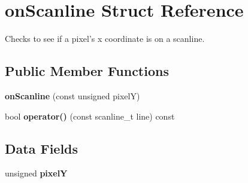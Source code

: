 \hypertarget{structonScanline}{
\section{onScanline Struct Reference}
\label{structonScanline}
}


Checks to see if a pixel's x coordinate is on a scanline.  


\subsection*{Public Member Functions}
\begin{DoxyCompactItemize}
\item 
\hypertarget{structonScanline_abb0bedaa715b27f8e48ae870c1fb80cb}{
{\bfseries onScanline} (const unsigned pixelY)}
\label{structonScanline_abb0bedaa715b27f8e48ae870c1fb80cb}

\item 
\hypertarget{structonScanline_ac482ea4c8b4641ac501bcbc1fdb82f94}{
bool {\bfseries operator()} (const scanline\_\-t line) const }
\label{structonScanline_ac482ea4c8b4641ac501bcbc1fdb82f94}

\end{DoxyCompactItemize}
\subsection*{Data Fields}
\begin{DoxyCompactItemize}
\item 
\hypertarget{structonScanline_acbfa8567990f056cb18c3793031c1bf8}{
unsigned {\bfseries pixelY}}
\label{structonScanline_acbfa8567990f056cb18c3793031c1bf8}

\end{DoxyCompactItemize}
